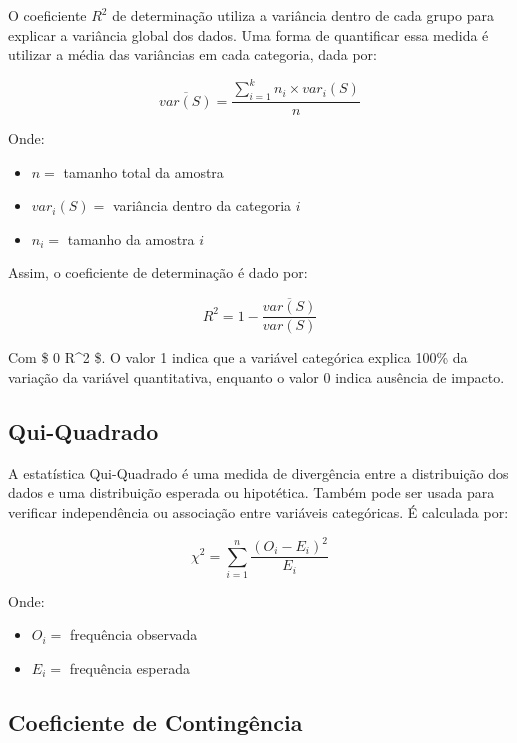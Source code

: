 \documentclass[
]{estat/estat}
\providecommand{\tightlist}{%
  \setlength{\itemsep}{0pt}\setlength{\parskip}{0pt}}\usepackage{longtable,booktabs,array}
\begin{document}
O coeficiente \(R^2\) de determinação utiliza a variância dentro de cada
grupo para explicar a variância global dos dados. Uma forma de
quantificar essa medida é utilizar a média das variâncias em cada
categoria, dada por:

\[
\overline{var(S)} = \frac{\displaystyle \sum_{i=1}^{k}n_i \times var_i(S)}{n}
\]

Onde:

\begin{itemize}
\tightlist
\item
  \(n =\) tamanho total da amostra
\item
  \(var_i(S) =\) variância dentro da categoria \(i\)
\item
  \(n_i =\) tamanho da amostra \(i\)
\end{itemize}

Assim, o coeficiente de determinação é dado por:

\[
R^2 = 1 - \frac{\overline{var(S)}}{var(S)}
\]

Com \$ 0 \leq R\^{}2 \$. O valor 1 indica que a variável
categórica explica 100\% da variação da variável quantitativa, enquanto
o valor 0 indica ausência de impacto.

\hypertarget{qui-quadrado}{%
\subsection{Qui-Quadrado}\label{qui-quadrado}}

A estatística Qui-Quadrado é uma medida de divergência entre a
distribuição dos dados e uma distribuição esperada ou hipotética. Também
pode ser usada para verificar independência ou associação entre
variáveis categóricas. É calculada por:

\[
\chi^2 = \sum_{i=1}^{n} \frac{(O_i-E_i)^2}{E_i}
\]

Onde:

\begin{itemize}
\tightlist
\item
  \(O_i =\) frequência observada
\item
  \(E_i =\) frequência esperada
\end{itemize}

\hypertarget{coeficiente-de-continguxeancia}{%
\subsection{Coeficiente de
Contingência}\label{coeficiente-de-continguxeancia}}
\end{document}

